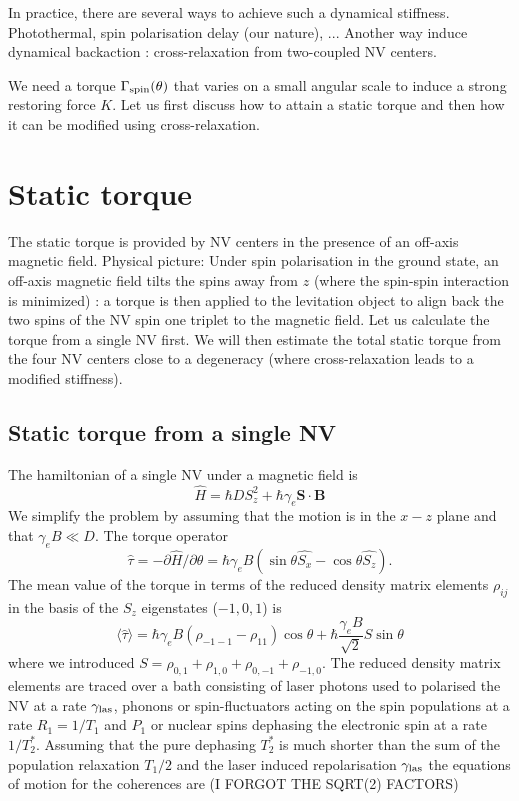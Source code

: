 \documentclass[preprintnumbers,amsmath,amssymb]{revtex4}
\newcommand{\be}{\begin{equation}}
\newcommand{\ee}{\end{equation}}
\begin{document}
In practice, there are several ways to achieve such a dynamical stiffness. Photothermal, spin polarisation delay (our nature), ...
Another way induce dynamical backaction : cross-relaxation from two-coupled NV centers. 

We need a torque $\Gamma_{\rm spin}(\theta)$ that varies on a small angular scale to induce a strong restoring force $K$. 
Let us first discuss how to attain a static torque and then how it can be modified using cross-relaxation. 

\section{Static torque}

The static torque is provided by NV centers in the presence of an off-axis magnetic field. 
Physical picture:  Under spin polarisation in the ground state, an off-axis magnetic field tilts the spins away from $z$ (where the spin-spin interaction is minimized) : a torque is then applied to the levitation object to align
back the two spins of the NV spin one triplet to the magnetic field.
Let us calculate the torque from a single NV first.  We will then estimate the total static torque from the four NV centers close to a degeneracy (where cross-relaxation leads to a modified stiffness).

\subsection{Static torque from a single NV}

The hamiltonian of a single NV under a magnetic field is 
\be
\hat{H}=\hbar D S_z^2+\hbar \gamma_e\bm S \cdot \bm B
\ee
We simplify the problem by assuming that the motion is in the $x-z$ plane and that $\gamma_e B \ll D$.
The torque operator 
\be
\hat \tau = -\partial \hat{H} /\partial \theta = \hbar \gamma_e B (\sin\theta \hat{S_x}-\cos\theta \hat{S_z}).
\ee
The mean value of the torque in terms of the reduced density matrix elements $\rho_{ij}$ in the basis of the $S_z$ eigenstates ($-1,0,1$) is
\be
\langle \hat \tau \rangle = \hbar \gamma_e B   (\rho_{-1-1}-\rho_{11})\cos\theta + \hbar \frac{\gamma_e B}{\sqrt{2}} S \sin\theta
\ee
where we introduced $S=\rho_{0,1}+\rho_{1,0}+\rho_{0,-1}+\rho_{-1,0}$.
The reduced density matrix elements are traced over a bath consisting of laser photons used to polarised the NV at a rate $\gamma_{\rm las}$, phonons or spin-fluctuators acting on the spin populations at a rate $R_1=1/T_1$ and 
$P_1$ or nuclear spins dephasing the electronic spin at a rate $1/T_2^*$.
Assuming that the pure dephasing $T_2^*$ is much shorter than the sum of the population relaxation $T_1/2$ and the laser induced repolarisation $\gamma_{\rm las}$ the equations of motion for the coherences are (I FORGOT THE SQRT(2) FACTORS)
 
\end{document}
